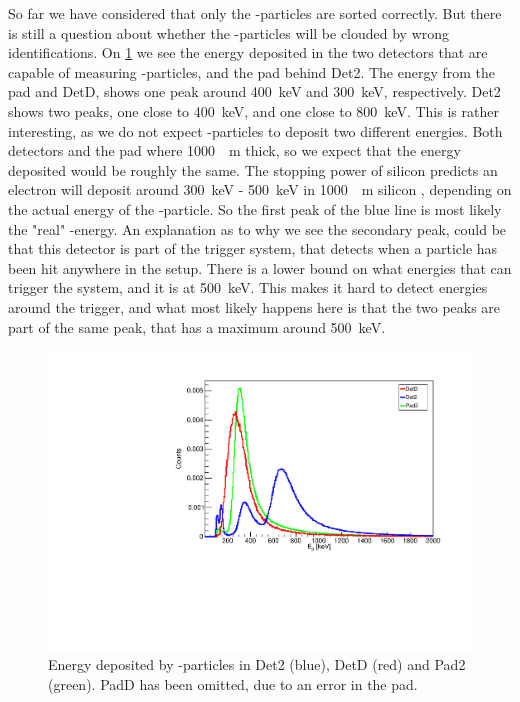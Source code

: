 So far we have considered that only the \al-particles are sorted correctly. But there is still a question about whether the \be-particles will be clouded by wrong identifications. 
On \cref{fig:beSpectrum} we see the energy deposited in the two detectors that are capable of measuring \be-particles, and the pad behind Det2.
The energy from the pad and DetD, shows one peak around \SI{400}{keV} and \SI{300}{keV}, respectively. 
Det2 shows two peaks, one close to \SI{400}{keV}, and one close to \SI{800}{keV}. This is rather interesting, as we do not expect \be-particles to deposit two different energies. Both detectors and the pad where \SI{1000}{\mu m} thick, so we expect that the energy deposited would be roughly the same. The stopping power of silicon predicts an electron will deposit around \SI{300}{keV} - \SI{500}{keV} in \SI{1000}{\mu m} silicon \cite{NIST_ASD}, depending on the actual energy of the \be-particle. So the first peak of the blue line is most likely the "real" \be-energy. 
An explanation as to why we see the secondary peak, could be that this detector is part of the trigger system, that detects when a particle has been hit anywhere in the setup. There is a lower bound on what energies that can trigger the system, and it is at \SI{500}{keV}. This makes it hard to detect energies around the trigger, and what most likely happens here is that the two peaks are part of the same peak, that has a maximum around \SI{500}{keV}.
\begin{figure}[h]
	\centering
	\includegraphics[width=\linewidth]{../figures/betaSpec.pdf}
	\caption{Energy deposited by \be-particles in Det2 (blue), DetD (red) and Pad2 (green). PadD has been omitted, due to an error in the pad.}
	\label{fig:beSpectrum}
\end{figure}

